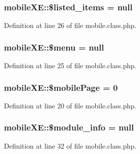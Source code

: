 \subsubsection[{\$listed\+\_\+items}]{\setlength{\rightskip}{0pt plus 5cm}mobile\+X\+E\+::\$listed\+\_\+items = null}\label{classmobileXE_abd07e5909154b43a31e2ebff5d51e4c7}


Definition at line 26 of file mobile.\+class.\+php.

\hypertarget{classmobileXE_a0ebb4296d28c9cb49fabb4d1252c1434}{}
\subsubsection[{\$menu}]{\setlength{\rightskip}{0pt plus 5cm}mobile\+X\+E\+::\$menu = null}\label{classmobileXE_a0ebb4296d28c9cb49fabb4d1252c1434}


Definition at line 25 of file mobile.\+class.\+php.

\hypertarget{classmobileXE_a4017307825d19d450c677b25b70eab5e}{}
\subsubsection[{\$mobile\+Page}]{\setlength{\rightskip}{0pt plus 5cm}mobile\+X\+E\+::\$mobile\+Page = 0}\label{classmobileXE_a4017307825d19d450c677b25b70eab5e}


Definition at line 20 of file mobile.\+class.\+php.

\hypertarget{classmobileXE_a926916a0195e056ccfdaf284e56b0ea6}{}
\subsubsection[{\$module\+\_\+info}]{\setlength{\rightskip}{0pt plus 5cm}mobile\+X\+E\+::\$module\+\_\+info = null}\label{classmobileXE_a926916a0195e056ccfdaf284e56b0ea6}


Definition at line 32 of file mobile.\+class.\+php.

\hypertarget{classmobileXE_aa6e85b2d6fe4667d7d0a3a2b3f13bd12}{}
